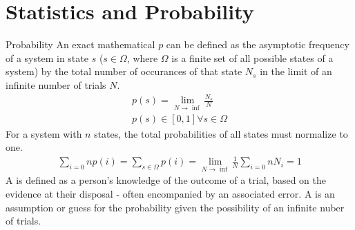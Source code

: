 \chapter{Statistics and Probability}
\thispagestyle{fancy}

\begin{defn}[Probability]{Probability}
An exact mathematical  $p$ can be defined as the asymptotic frequency of a system in state $s$ ($s \in \Omega$, where $\Omega$ is a finite set of all possible states of a system) by the total number of occurances of that state $N_s$ in the limit of an infinite number of trials $N$.
    \begin{align}
        p(s) = \lim_{N\rightarrow\inf}\frac{N_s}{N} \\
	p(s) \in [0,1] \forall s \in \Omega
    \end{align}
For a system with $n$ states, the total probabilities of all states must normalize to one.
    \begin{align}
        \sum_{i=0}{n}p(i) = \sum_{s \in \Omega}p(i) = \lim_{N\rightarrow\inf}\frac{1}{N}\sum_{i=0}{n}N_i = 1
    \end{align}
A  is defined as a person's knowledge of the outcome of a trial, based on the evidence at their disposal - often encompanied by an associated error. A  is an assumption or guess for the probability given the possibility of an infinite nuber of trials.
\end{defn}

